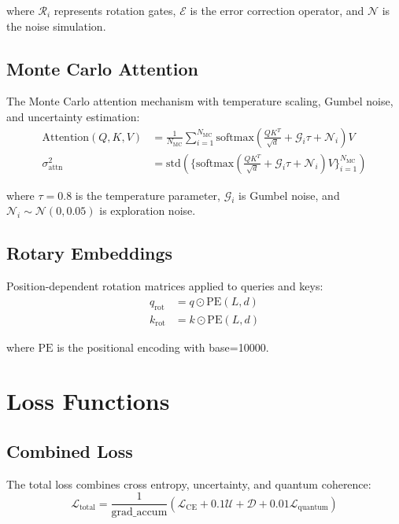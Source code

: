 \documentclass{article}
\begin{document}
where $\mathcal{R}_i$ represents rotation gates, $\mathcal{E}$ is the error correction operator, and $\mathcal{N}$ is the noise simulation.

\subsection{Monte Carlo Attention}
The Monte Carlo attention mechanism with temperature scaling, Gumbel noise, and uncertainty estimation:
\begin{align*}
\text{Attention}(Q,K,V) &= \frac{1}{N_{\text{MC}}}\sum_{i=1}^{N_{\text{MC}}} \text{softmax}\left(\frac{QK^T}{\sqrt{d}} + \mathcal{G}_i\tau + \mathcal{N}_i\right)V \\
\sigma^2_{\text{attn}} &= \text{std}\left(\{\text{softmax}(\frac{QK^T}{\sqrt{d}} + \mathcal{G}_i\tau + \mathcal{N}_i)V\}_{i=1}^{N_{\text{MC}}}\right)
\end{align*}

where $\tau=0.8$ is the temperature parameter, $\mathcal{G}_i$ is Gumbel noise, and $\mathcal{N}_i \sim \mathcal{N}(0, 0.05)$ is exploration noise.

\subsection{Rotary Embeddings}
Position-dependent rotation matrices applied to queries and keys:
\begin{equation}
\begin{split}
q_{\text{rot}} &= q \odot \text{PE}(L,d) \\
k_{\text{rot}} &= k \odot \text{PE}(L,d)
\end{split}
\end{equation}

where $\text{PE}$ is the positional encoding with base=10000.

\section{Loss Functions}

\subsection{Combined Loss}
The total loss combines cross entropy, uncertainty, and quantum coherence:
\begin{equation}
\mathcal{L}_{\text{total}} = \frac{1}{\text{grad\_accum}}\left(\mathcal{L}_{\text{CE}} + 0.1\mathcal{U} + \mathcal{D} + 0.01\mathcal{L}_{\text{quantum}}\right)
\end{equation}
\end{document}
